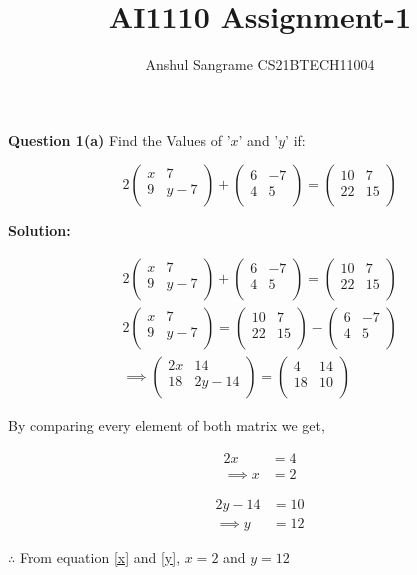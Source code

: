 \documentclass[journal,12pt,twocolumn]{IEEEtran}
\title{AI1110 Assignment-1}
\author{Anshul Sangrame CS21BTECH11004}
\begin{document}
\maketitle

\noindent \textbf{Question 1(a)} Find the Values of '$x $' and '$y $' if: 

$$
2
\begin{pmatrix}
x & 7 \\
9 & y-7 \\
\end{pmatrix}
+
\begin{pmatrix}
6 & -7 \\
4 & 5 \\
\end{pmatrix}
=
\begin{pmatrix}
10 & 7 \\
22 & 15 \\
\end{pmatrix}
$$

\noindent \textbf{Solution: }


\begin{align}
2
\begin{pmatrix}
x & 7 \\
9 & y-7 \\
\end{pmatrix}
+
\begin{pmatrix}
6 & -7 \\
4 & 5 \\
\end{pmatrix}
=
\begin{pmatrix}
10 & 7 \\
22 & 15 \\
\end{pmatrix}
\\
2
\begin{pmatrix}
x & 7 \\
9 & y-7 \\
\end{pmatrix}
=
\begin{pmatrix}
10 & 7 \\
22 & 15 \\
\end{pmatrix}
-
\begin{pmatrix}
6 & -7 \\
4 & 5 \\
\end{pmatrix}
\\
\implies
\begin{pmatrix}
2x & 14 \\
18 & 2y-14 \\
\end{pmatrix}
=
\begin{pmatrix}
4 & 14\\
18 & 10\\
\end{pmatrix}
\end{align}


\noindent By comparing every element of both matrix we get,

\begin{align}
2x &= 4\\
\label{x}
\implies
x &= 2
\end{align}

\begin{align}
2y-14 &= 10\\
\label{y}
\implies
y &= 12
\end{align}


\noindent $ \therefore$ From equation \ref{x} and \ref{y},  $x = 2$ and $y=12 $
\end{document}
